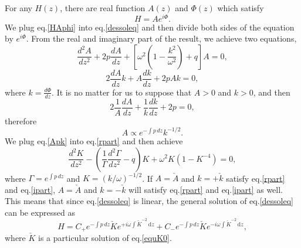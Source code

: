 \documentclass[
 jor,
 amsmath,amssymb,preprint,
]{revtex4-2}
\def\d{\mathrm{d}}
\begin{document}
For any $H(z)$, there are real function $A(z)$ and $\Phi(z)$ which satisfy
\begin{equation}\label{HAphi}
    H=Ae^{i\Phi}.
\end{equation}
We plug eq.\eqref{HAphi} into eq.\eqref{dessoleq} and then divide both sides of the equation by $e^{i\Phi}$. From the real and imaginary part of the result, we achieve two equations,
\begin{equation}\label{rpart}
    \frac{d^2 A}{d z^2}+2p\frac{d A}{d z}+\left[\omega^2\left(1-\frac{k^2}{\omega^2}\right)+q\right]A=0,
\end{equation}
\begin{equation}\label{ipart}
    2\frac{d A}{d z}k+A\frac{d k}{d z}+2pAk=0,
\end{equation}
where $k=\frac{d \Phi}{d z}$. It is no matter for us to suppose that $A>0$ and $k>0$, and then
\begin{equation}
    2\frac{1}{A}\frac{d A}{d z}+\frac{1}{k}\frac{d k}{d z}+2p=0,
\end{equation}
therefore
\begin{equation}\label{Apk}
    A\propto e^{-\int p\,dz}k^{-1/2}.
\end{equation}
We plug eq.\eqref{Apk} into eq.\eqref{rpart} and then achieve
\begin{equation}\label{equK0}
    \frac{d^2 K}{d z^2}-\left(\frac{1}{\Gamma}\frac{d^2\Gamma}{d z^2}-q\right)K+\omega^2K(1-K^{-4})=0,
\end{equation}
where $\Gamma=e^{\int p \,dz}$ and $K=(k/\omega)^{-1/2}$. If $A=\check{A}$ and $k=+\check{k}$ satisfy eq.\eqref{rpart} and eq.\eqref{ipart}, $A=\check{A}$ and $k=-\check{k}$ will satisfy eq.\eqref{rpart} and eq.\eqref{ipart} as well. This means that since eq.\eqref{dessoleq} is linear, the general solution of eq.\eqref{dessoleq} can be expressed as
\begin{equation}
    H=C_+e^{-\int p\,dz}\check{K}e^{+i\omega\int  \check{K}^{-2}\,\d z}+C_-e^{-\int p\,dz}\check{K}e^{-i\omega\int  \check{K}^{-2}\,\d z},
\end{equation}
where $\check{K}$ is a particular solution of eq.\eqref{equK0}.
\end{document}
